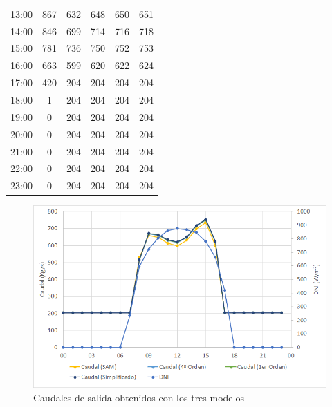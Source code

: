 \begin{table}[!h]
{\begin{tabular}{cccccc}
13:00 & 867 & 632          & 648               & 650                & 651                   \\ 
14:00 & 846 & 699          & 714               & 716                & 718                   \\ 
15:00 & 781 & 736          & 750               & 752                & 753                   \\ 
16:00 & 663 & 599          & 620               & 622                & 624                   \\ 
17:00 & 420 & 204          & 204               & 204                & 204                   \\ 
18:00 & 1   & 204          & 204               & 204                & 204                   \\ 
19:00 & 0   & 204          & 204               & 204                & 204                   \\ 
20:00 & 0   & 204          & 204               & 204                & 204                   \\ 
21:00 & 0   & 204          & 204               & 204                & 204                   \\ 
22:00 & 0   & 204          & 204               & 204                & 204                   \\ 
23:00 & 0   & 204          & 204               & 204                & 204                   
\end{tabular}%
}
\end{table}

\begin{figure}[!h]
\includegraphics[width=0.9\linewidth]{images/caudales_modelos.png}
\caption{Caudales de salida obtenidos con los tres modelos} 
\label{fig:caudales_modelos}
\end{figure}


